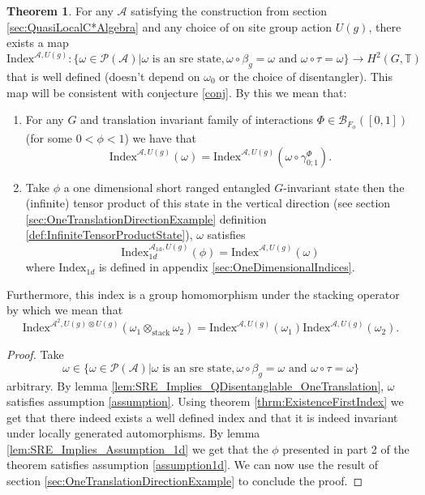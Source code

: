 \documentclass[12pt,a4paper,twoside]{article}
\newcommand{\BB}{\mathcal B}
\newcommand{\PP}{\mathcal P}
\newcommand{\TT}{\mathbb T}
\renewcommand{\AA}{\mathcal A}
\theoremstyle{definition}
\newtheorem{theorem}{Theorem}[section]
\numberwithin{equation}{section}
\begin{document}
\begin{theorem}
	For any $\AA$ satisfying the construction from section \ref{sec:QuasiLocalC*Algebra} and any choice of on site group action $U(g)$, there exists a map
	\begin{equation}
		\textrm{Index}^{\AA,U(g)}:\{\omega\in\PP(\AA)|\omega\text{ is an sre state},\omega\circ\beta_g=\omega\text{ and }\omega\circ\tau=\omega\}\rightarrow H^2(G,\TT)
	\end{equation}
	that is well defined (doesn't depend on $\omega_0$ or the choice of disentangler). This map will be consistent with conjecture \ref{conj}. By this we mean that:
	\begin{enumerate}
		\item For any $G$ and translation invariant family of interactions $\Phi\in\BB_{F_{\phi}}([0,1])$ (for some $0<\phi<1$) we have that
		\begin{equation}
			\textrm{Index}^{\AA,U(g)}(\omega)=\textrm{Index}^{\AA,U(g)}(\omega\circ\gamma^{\Phi}_{0;1}).
		\end{equation}
		\item Take $\phi$ a one dimensional short ranged entangled $G$-invariant state then the (infinite) tensor product of this state in the vertical direction (see section \ref{sec:OneTranslationDirectionExample} definition \ref{def:InfiniteTensorProductState}), $\omega$ satisfies
		\begin{equation}
			\textrm{Index}^{\AA_{\text{1d}},U(g)}_{1d}(\phi)=\textrm{Index}^{\AA,U(g)}(\omega)
		\end{equation}
		where $\textrm{Index}_{1d}$ is defined in appendix \ref{sec:OneDimensionalIndices}.
	\end{enumerate}
	Furthermore, this index is a group homomorphism under the stacking operator by which we mean that
	\begin{equation}
		\textrm{Index}^{\AA^2,U(g)\otimes U(g)}(\omega_1\otimes_{\text{stack}}\omega_2)=\textrm{Index}^{\AA,U(g)}(\omega_1)\textrm{Index}^{\AA,U(g)}(\omega_2).
	\end{equation}
\end{theorem}
\begin{proof}
	Take
	\begin{equation}
		\omega\in \{\omega\in\PP(\AA)|\omega\text{ is an sre state},\omega\circ\beta_g=\omega\text{ and }\omega\circ\tau=\omega\}
	\end{equation}
	arbitrary. By lemma \ref{lem:SRE_Implies_QDisentanglable_OneTranslation}, $\omega$ satisfies assumption \ref{assumption}. Using theorem \ref{thrm:ExistenceFirstIndex} we get that there indeed exists a well defined index and that it is indeed invariant under locally generated automorphisms. By lemma \ref{lem:SRE_Implies_Assumption_1d} we get that the $\phi$ presented in part 2 of the theorem satisfies assumption \ref{assumption1d}. We can now use the result of section \ref{sec:OneTranslationDirectionExample} to conclude the proof.
\end{proof}
\end{document}
